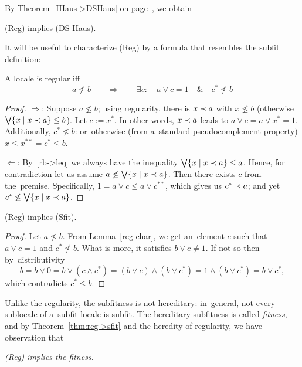 By Theorem~\ref{IHaus->DSHaus} on page~\pageref{IHaus->DSHaus}\thinspace, we
obtain
\begin{cor}
  (Reg) implies (DS-Haus).
\end{cor}

It will be useful to characterize (Reg) by a formula that resembles the subfit
definition:
\begin{lem} \label{reg-char}
  A locale is regular iff
  \[
    a \not\le b \qquad \Rightarrow \qquad \exists c: \quad a \vee c = 1 \quad
    \& \quad c^* \not\leq b
  \]
\end{lem}
\begin{proof}
  $\Rightarrow$:
  Suppose $a \not\le b$;
  using regularity, there is $x \prec a$ with $x \not\le b$ (otherwise $\bigvee
  \{x \mid x \prec a\} \le b$).
  Let $c := x^*$.
  In other words, $x \prec a$ leads to $a \vee c = a \vee x^* = 1$.
  Additionally, $c^* \not\le b$:
  or~otherwise (from a~standard pseudocomplement property) $x \le x^{**} = c^*
  \le b$.

  $\Leftarrow$:
  By~\ref{rb->leq} we always have the inequality $\bigvee \{x \mid x \prec a\} \le
  a$.
  Hence, for contradiction let us assume $a \not\le \bigvee \{x \mid x \prec a\}$.
  Then there exists $c$ from the~premise.
  Specifically, $1 = a \vee c \le a \vee c^{**}$, which gives us $c^* \prec a$;
  and yet $c^* \not\le \bigvee \{x \mid x \prec a\}$.
\end{proof}

\begin{thm} \label{thm:reg->sfit}
  (Reg) implies (Sfit).
\end{thm}
\begin{proof}
  Let $a \not\le b$.
  From Lemma~\ref{reg-char}\thinspace, we get an~element $c$ such that $a \vee
  c = 1$ and $c^* \not\le b$.
  What is more, it satisfies $b \vee c \ne 1$.
  If not so then by~distributivity
  \[
    b = b \vee 0 = b \vee (c \wedge c^*) = (b \vee c) \wedge (b \vee c^*) = 1
    \wedge (b \vee c^*) = b \vee c^*,
  \]
  which contradicts $c^* \le b$.
\end{proof}

\begin{rem}[Fitness]
  Unlike the regularity, the subfitness is not hereditary:
  in~general, not every sublocale of a~subfit locale is subfit.
  The hereditary subfitness is called \emph{fitness\/}, and by
  Theorem~\ref{thm:reg->sfit} and the heredity of regularity, we have
  observation that
  \begin{center} \it
    (Reg) implies the fitness.
  \end{center}
\end{rem}
